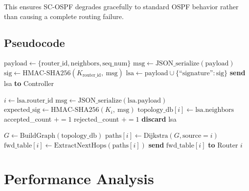 \documentclass[12pt,a4paper]{article}
\begin{document}
This ensures SC-OSPF degrades gracefully to standard OSPF behavior rather than
causing a complete routing failure.

\subsection{Pseudocode}

\begin{algorithm}[H]
\caption{SC-OSPF Router: LSA Generation and Transmission}
\label{alg:router}
\begin{algorithmic}[1]
  \State $\text{payload} \gets \{\text{router\_id}, \text{neighbors}, \text{seq\_num}\}$
  \State $\text{msg} \gets \text{JSON\_serialize}(\text{payload})$
  \State $\text{sig} \gets \text{HMAC-SHA256}(K_{\text{router\_id}},\ \text{msg})$
  \State $\text{lsa} \gets \text{payload} \cup \{\text{``signature''}: \text{sig}\}$
  \State \textbf{send} lsa \textbf{to} Controller
\EndProcedure
\end{algorithmic}
\end{algorithm}

\begin{algorithm}[H]
\caption{SC-OSPF Controller: LSA Verification and Route Distribution}
\label{alg:controller}
\begin{algorithmic}[1]
  \State $i \gets \text{lsa.router\_id}$
  \State $\text{msg} \gets \text{JSON\_serialize}(\text{lsa.payload})$
  \State $\text{expected\_sig} \gets \text{HMAC-SHA256}(K_i,\ \text{msg})$
    \State $\text{topology\_db}[i] \gets \text{lsa.neighbors}$
    \State accepted\_count $\mathrel{+}= 1$
  \Else
    \State rejected\_count $\mathrel{+}= 1$ 
    \State \textbf{discard} lsa
  \EndIf
\EndProcedure

  \State $G \gets \text{BuildGraph}(\text{topology\_db})$
    \State $\text{paths}[i] \gets \text{Dijkstra}(G, \text{source}=i)$
    \State $\text{fwd\_table}[i] \gets \text{ExtractNextHops}(\text{paths}[i])$
    \State \textbf{send} $\text{fwd\_table}[i]$ \textbf{to} Router $i$
  \EndFor
\EndProcedure
\end{algorithmic}
\end{algorithm}

\section{Performance Analysis}
\end{document}
